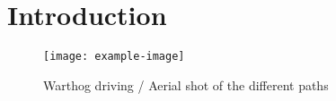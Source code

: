\section{Introduction}
\label{sec:intro}

\lightlipsum[1]
\cite{Pomerleau2014}

\begin{figure} [h]
	\centering
	\texttt{[image: example-image]}
	\caption{Warthog driving / Aerial shot of the different paths}
	\label{fig:front_fig}
\end{figure}

\lightlipsum[1]
\lightlipsum[1]
\lightlipsum[1]
